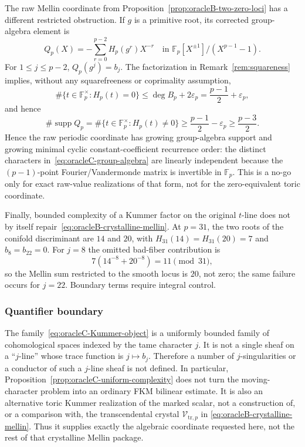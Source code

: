 The raw Mellin coordinate from
Proposition~\ref{prop:oracleB-two-zero-loci} has a different restricted
obstruction.  If $g$ is a primitive root, its corrected group-algebra
element is
\begin{equation}
 Q_p(X)=-\sum_{r=0}^{p-2}H_p(g^r)X^{-r}
 \quad\text{in }\mathbb F_p[X^{\pm1}]/(X^{p-1}-1).
 \label{eq:oracleC-group-algebra}
\end{equation}
For $1\leq j\leq p-2$, $Q_p(g^j)=b_j$.  The factorization in
Remark~\ref{rem:squareness} implies, without any squarefreeness or
coprimality assumption,
\[
 \#\{t\in\mathbb F_p^\times:H_p(t)=0\}
 \leq\deg B_p+2\varepsilon_p
 =\frac{p-1}{2}+\varepsilon_p,
\]
and hence
\[
 \#\operatorname {supp}Q_p
 =\#\{t\in\mathbb F_p^\times:H_p(t)\ne0\}
 \geq\frac{p-1}{2}-\varepsilon_p
 \geq\frac{p-3}{2}.
\]
Hence the raw periodic coordinate has growing group-algebra support and
growing minimal cyclic constant-coefficient recurrence order: the distinct
characters in~\eqref{eq:oracleC-group-algebra} are linearly independent
because the $(p-1)$-point Fourier/Vandermonde matrix is invertible in
$\mathbb F_p$.  This is a
no-go only for exact raw-value realizations of that form, not for the
zero-equivalent toric coordinate.

Finally, bounded complexity of a Kummer factor on the original $t$-line
does not by itself repair~\eqref{eq:oracleB-crystalline-mellin}.  At
$p=31$, the two roots of the conifold discriminant are $14$ and $20$,
with $H_{31}(14)=H_{31}(20)=7$ and $b_8=b_{22}=0$.  For $j=8$ the omitted
bad-fiber contribution is
\[
 7(14^{-8}+20^{-8})=11\pmod {31},
\]
so the Mellin sum restricted to the smooth locus is $20$, not zero; the
same failure occurs for $j=22$.  Boundary terms require integral control.

\subsubsection{Quantifier boundary}

The family~\eqref{eq:oracleC-Kummer-object} is a uniformly bounded family
of cohomological spaces indexed by the tame character $j$.  It is not a
single sheaf on a ``$j$-line'' whose trace function is
$j\mapsto b_j$.  Therefore a number of $j$-singularities or a conductor
of such a $j$-line sheaf is not defined.  In particular,
Proposition~\ref{prop:oracleC-uniform-complexity} does not turn the
moving-character problem into an ordinary FKM bilinear estimate.
It is also an alternative toric Kummer realization of the marked scalar,
not a construction of, or a comparison with, the transcendental crystal
$\mathcal V_{\mathrm{tr},p}$ in
\eqref{eq:oracleB-crystalline-mellin}.  Thus it supplies exactly the
algebraic coordinate requested here, not the rest of that crystalline
Mellin package.

